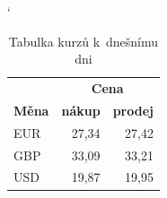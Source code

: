 \documentclass[a4paper,11pt,titlepage]{article}
\begin{document}
\bigskip
\begin{table}[h]
\begin{center}
\catcode`
\begin{tabular}{|l|r|r|} \hline
    & \multicolumn{2}{|c|}{\textbf{Cena}}\\\cline{2-3}
    \textbf{Měna} & \textbf{nákup} & \textbf{prodej}\\ \hline
    EUR & 27,34 & 27,42\\
    GBP & 33,09 & 33,21\\
    USD & 19,87 & 19,95\\ \hline
\end{tabular}
\caption{Tabulka kurzů k~dnešnímu dni}
\label{tab:Kurzy}
\end{center}
\end{table}
\end{document}

